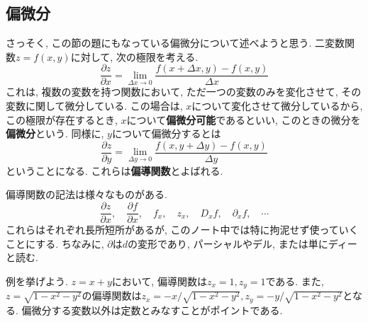     \subsection{偏微分}
        さっそく, この節の題にもなっている偏微分について述べようと思う. 二変数関数$z=f(x,y)$に対して, 次の極限を考える.
        \begin{equation}
            \frac{\partial z}{\partial x} =\lim_{\Delta x\to 0}\frac{f(x+\Delta x,y)-f(x,y)}{\Delta x} \label{eq:偏微分:xについて偏微分} 
        \end{equation}
        これは, 複数の変数を持つ関数において, ただ一つの変数のみを変化させて, その変数に関して微分している. この場合は, $x$について変化させて微分しているから, 
        この極限が存在するとき, $x$について\textbf{偏微分可能}であるといい, このときの微分を\textbf{偏微分}という.
        同様に, $y$について偏微分するとは
        \begin{equation}
            \frac{\partial z}{\partial y} =\lim_{\Delta y\to 0}\frac{f(x,y+\Delta y)-f(x,y)}{\Delta y} \label{eq:偏微分:yについて偏微分} 
        \end{equation}
        ということになる. これらは\textbf{偏導関数}とよばれる.

        偏導関数の記法は様々なものがある.
        \begin{equation}
            \frac{\partial z}{\partial x},\quad \frac{\partial f}{\partial x},\quad f_x,\quad z_x,\quad D_x f,\quad \partial_x f,\quad\cdots
        \end{equation}
        これらはそれぞれ長所短所があるが, このノート中では特に拘泥せず使っていくことにする. ちなみに, $\partial$は$d$の変形であり, パーシャルやデル, または単にディーと読む.

        例を挙げよう. $z=x+y$において, 偏導関数は$z_x=1,z_y=1$である. また, $z=\sqrt{1-x^2-y^2}$の偏導関数は$z_x=-x/\sqrt{1-x^2-y^2},z_y=-y/\sqrt{1-x^2-y^2}$となる.
        偏微分する変数以外は定数とみなすことがポイントである.
        
